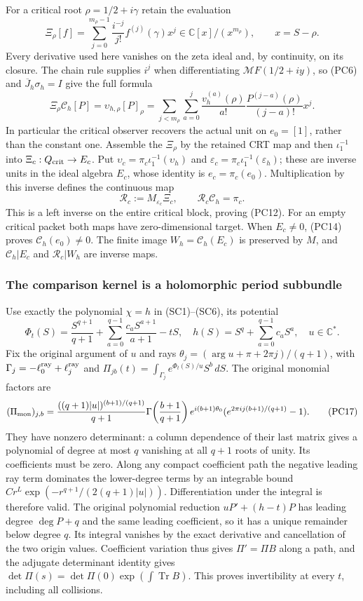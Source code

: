 For a critical root $\rho=1/2+i\gamma$ retain the evaluation
\[
 \Xi_\rho[f]=\sum_{j=0}^{m_\rho-1}
       \frac{i^{-j}}{j!}f^{(j)}(\gamma)x^j
       \in\mathbb C[x]/(x^{m_\rho}),\qquad x=S-\rho.
 \tag{PC13}
\]
Every derivative used here vanishes on the zeta ideal and, by
continuity, on its closure.  The chain rule supplies $i^j$ when
differentiating $\mathcal MF(1/2+iy)$, so (PC6) and
$\overline J_h\sigma_h=I$ give the full formula
\[
 \Xi_\rho\mathcal C_h[P]
 =\upsilon_{h,\rho}[P]_\rho
 =\sum_{j<m_\rho}\sum_{a=0}^j
   \frac{v_h^{(a)}(\rho)}{a!}
   \frac{P^{(j-a)}(\rho)}{(j-a)!}x^j.
 \tag{PC14}
\]
In particular the critical observer recovers the actual unit on
$e_0=[1]$, rather than the constant one.  Assemble the $\Xi_\rho$
by the retained CRT map and then $\iota_1^{-1}$ into
$\Xi_c:Q_{\rm crit}\to E_c$.  Put
$\upsilon_c=\pi_c\iota_1^{-1}(\upsilon_h)$ and
$\varepsilon_c=\pi_c\iota_1^{-1}(\varepsilon_h)$; these are
inverse units in the ideal algebra $E_c$, whose identity is
$e_c=\pi_c(e_0)$.  Multiplication by this inverse defines the continuous map
\[
 \mathcal R_c:=M_{\varepsilon_c}\Xi_c,
 \qquad \mathcal R_c\mathcal C_h=\pi_c.
 \tag{PC15}
\]
This is a left inverse on the entire critical block, proving (PC12).
For an empty critical packet both maps have zero-dimensional target.
When $E_c\ne0$, (PC14) proves $\mathcal C_h(e_0)\ne0$.
The finite image $W_h=\mathcal C_h(E_c)$ is preserved by $M$,
and $\mathcal C_h|E_c$ and $\mathcal R_c|W_h$ are inverse maps.

\subsubsection{The comparison kernel is a holomorphic period subbundle}

Use exactly the polynomial $\chi=h$ in (SC1)--(SC6), its potential
\[
 \Phi_t(S)=\frac{S^{q+1}}{q+1}
   +\sum_{a=0}^{q-1}\frac{c_aS^{a+1}}{a+1}-tS,
 \quad h(S)=S^q+\sum_{a=0}^{q-1}c_aS^a,
 \quad u\in\mathbb C^*.
 \tag{PC16}
\]
Fix the original argument of $u$ and rays
$\theta_j=(\arg u+\pi+2\pi j)/(q+1)$, with
$\Gamma_j=-\ell_0^{\rm ray}+\ell_j^{\rm ray}$ and
$\Pi_{jb}(t)=\int_{\Gamma_j}e^{\Phi_t(S)/u}S^b\,dS$.
The original monomial factors are
\[
 (\Pi_{\rm mon})_{j,b}=
 \frac{((q+1)|u|)^{(b+1)/(q+1)}}{q+1}
 \Gamma\!\left(\frac{b+1}{q+1}\right)e^{i(b+1)\theta_0}
 (e^{2\pi i j(b+1)/(q+1)}-1).
 \tag{PC17}
\]
They have nonzero determinant: a column dependence of their last
matrix gives a polynomial of degree at most $q$ vanishing at all
$q+1$ roots of unity.  Its coefficients must be zero.  Along any
compact coefficient path the negative leading ray term dominates
the lower-degree terms by an integrable bound
$Cr^L\exp(-r^{q+1}/(2(q+1)|u|))$.  Differentiation under the
integral is therefore valid.  The original polynomial reduction
$uP'+(h-t)P$ has leading degree $\deg P+q$ and the same leading
coefficient, so it has a unique remainder below degree $q$.
Its integral vanishes by the exact derivative and cancellation of
the two origin values.  Coefficient variation thus gives
$\Pi'=\Pi B$ along a path, and the adjugate determinant identity
gives $\det\Pi(s)=\det\Pi(0)\exp(\int\operatorname{Tr}B)$.
This proves invertibility at every $t$, including all collisions.

